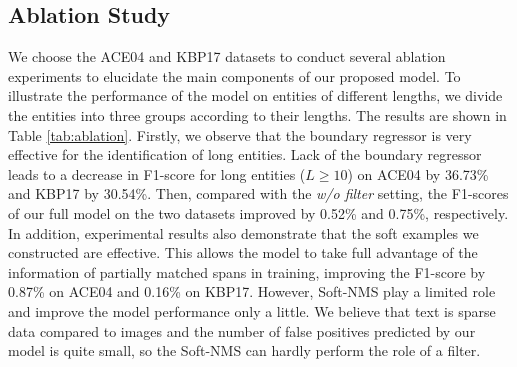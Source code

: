 \documentclass[11pt,a4paper]{article}
\begin{document}
\subsection{Ablation Study}

We choose the ACE04 and KBP17 datasets to conduct several ablation experiments to elucidate the main components of our proposed model. To illustrate the performance of the model on entities of different lengths, we divide the entities into three groups according to their lengths. The results are shown in Table \ref{tab:ablation}. Firstly, we observe that the boundary regressor is very effective for the identification of long entities. Lack of the boundary regressor leads to a decrease in F1-score for long entities ($L\geq10$) on ACE04 by 36.73\% and KBP17 by 30.54\%. Then, compared with the \textit{w/o filter} setting, the F1-scores of our full model on the two datasets improved by 0.52\% and 0.75\%, respectively. In addition, experimental results also demonstrate that the soft examples we constructed are effective. This allows the model to take full advantage of the information of partially matched spans in training, improving the F1-score by 0.87\% on ACE04 and 0.16\% on KBP17. However, Soft-NMS play a limited role and improve the model performance only a little. We believe that text is sparse data compared to images and the number of false positives predicted by our model is quite small, so the Soft-NMS can hardly perform the role of a filter.
\end{document}
